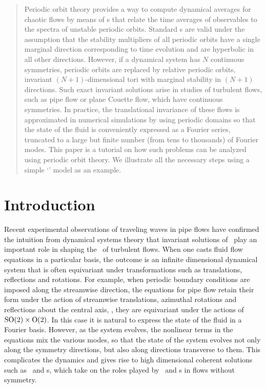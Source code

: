\documentclass[aip,cha,
reprint,
secnumarabic,
nofootinbib, tightenlines,
nobibnotes, showkeys, showpacs,
superscriptaddress,
]{revtex4-1}
\begin{document}
\begin{quotation}
Periodic orbit theory provides a way to compute dynamical averages for
chaotic flows by means of {\cycForm s} that relate the time averages of
observables to the spectra of unstable periodic orbits. Standard
{\cycForm s} are valid under the assumption that the stability
multipliers of all periodic orbits have a single marginal direction
corresponding to time evolution and are hyperbolic in all other
directions. However, if a dynamical system has $N$ continuous symmetries,
periodic orbits are replaced by relative periodic orbits, invariant
$(N+1)$-dimensional tori with marginal stability in $(N+1)$ directions.
Such exact invariant solutions arise in studies of turbulent flows, such
as pipe flow or plane Couette flow, which have continuous symmetries.
In practice, the translational invariance of these flows is approximated in numerical 
simulations by using periodic domains so that the state of the fluid
is conveniently expressed as a Fourier series, truncated to a large but finite
number (from tens to thousands) of Fourier modes. This paper is a tutorial on
how such problems can be analyzed using periodic orbit theory. We illustrate
all the necessary steps using a simple `\twomode' model as an example.
\end{quotation}

\section{Introduction}
\label{s:intro}

Recent experimental observations of traveling waves in pipe flows have
confirmed the intuition from dynamical systems theory that invariant solutions
of \NSe\ play an important role in shaping the \statesp\ of turbulent
flows. When one casts fluid flow equations in a
particular basis, the outcome is an infinite dimensional dynamical system
that is often equivariant under transformations such as
translations, reflections and rotations. For example, when periodic
boundary conditions are imposed along the streamwise direction, the equations
for pipe flow retain their form under the action of streamwise translations,
azimuthal rotations and reflections about the central axis, \ie, they are equivariant
under the actions of $\textrm{SO}(2)\times\textrm{O}(2)$. In this case it is natural
to express the state of the fluid in a Fourier basis. However,
as the system evolves, the nonlinear terms in the equations mix the
various modes, so that the state of the system evolves not only along the
symmetry directions, but also along directions transverse to them.
This complicates the dynamics and gives rise to high dimensional coherent
solutions such as \reqva\ and \rpo s, which take on the roles played by
\eqva\ and \po s in flows without symmetry.
\end{document}
